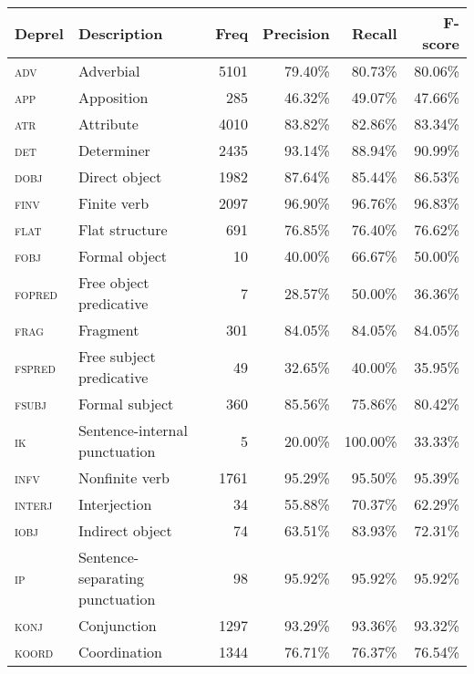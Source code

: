 \documentclass[a4paper,12pt,english]{book}
\begin{document}
\begin{table}
    \centering
    \smaller[0.5]
    \begin{tabular}{@{}llrrrr@{}}
        \toprule
        \textbf{Deprel} & \textbf{Description} & \textbf{Freq} &
        \textbf{Precision} & \textbf{Recall} & \textbf{F-score} \\
        \midrule
        \textsc{adv} & Adverbial & 5101 & 79.40\% & 80.73\% & 80.06\% \\
        \textsc{app} & Apposition & 285 & 46.32\% & 49.07\% & 47.66\% \\
        \textsc{atr} & Attribute & 4010 & 83.82\% & 82.86\% & 83.34\% \\
        \textsc{det} & Determiner & 2435 & 93.14\% & 88.94\% & 90.99\% \\
        \textsc{dobj} & Direct object & 1982 & 87.64\% & 85.44\% & 86.53\% \\
        \textsc{finv} & Finite verb & 2097 & 96.90\% & 96.76\% & 96.83\% \\
        \textsc{flat} & Flat structure & 691 & 76.85\% & 76.40\% & 76.62\%\\
        \textsc{fobj} & Formal object & 10 & 40.00\% & 66.67\% & 50.00\% \\
        \textsc{fopred} & Free object predicative & 7 & 28.57\% & 50.00\% & 36.36\% \\
        \textsc{frag} & Fragment & 301 & 84.05\% & 84.05\% & 84.05\% \\
        \textsc{fspred} & Free subject predicative & 49 & 32.65\% & 40.00\% & 35.95\%\\
        \textsc{fsubj} & Formal subject & 360 & 85.56\% & 75.86\% & 80.42\% \\
        \textsc{ik} & Sentence-internal punctuation & 5 & 20.00\% & 100.00\% & 33.33\% \\
        \textsc{infv} & Nonfinite verb & 1761 & 95.29\% & 95.50\% & 95.39\% \\
        \textsc{interj} & Interjection & 34 & 55.88\% & 70.37\% & 62.29\% \\
        \textsc{iobj} & Indirect object & 74 & 63.51\% & 83.93\% & 72.31\% \\
        \textsc{ip} & Sentence-separating punctuation & 98 & 95.92\% & 95.92\% & 95.92\% \\
        \textsc{konj} & Conjunction & 1297 & 93.29\% & 93.36\% & 93.32\% \\
        \textsc{koord} & Coordination & 1344 & 76.71\% & 76.37\% & 76.54\% \\

\end{tabular}
\end{table}
\end{document}
